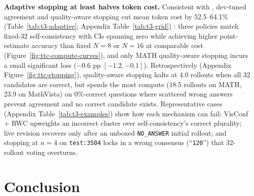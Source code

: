 \documentclass{article}
\begin{document}
\textbf{Adaptive stopping at least halves token cost.} Consistent with \citet{aggarwal2023adaptiveconsistency}, dev-tuned agreement and quality-aware stopping cut mean token cost by 52.5--64.1\% (Table~\ref{tab:t3-adaptive}; Appendix Table~\ref{tab:t3-grid}) \citep{usman2026visconf}: three policies match fixed-32 self-consistency with CIs spanning zero while achieving higher point-estimate accuracy than fixed $N=8$ or $N=16$ at comparable cost (Figure~\ref{fig:ttc-compute-curves}), and only MATH quality-aware stopping incurs a small significant loss ($-0.6$ pp $[-1.2, -0.1]$). Retrospectively (Appendix Figure~\ref{fig:ttc-stopping}), quality-aware stopping halts at 4.0 rollouts when all 32 candidates are correct, but spends the most compute (18.5 rollouts on MATH, 23.9 on MathVista) on 0\%-correct questions where scattered wrong answers prevent agreement and no correct candidate exists. Representative cases (Appendix Table~\ref{tab:t3-examples}) show how each mechanism can fail: VisConf + RWC upweights an incorrect cluster over self-consistency's correct plurality; live revision recovers only after an unboxed \texttt{NO\_ANSWER} initial rollout; and stopping at $n=4$ on \texttt{test:3504} locks in a wrong consensus (``\texttt{120}'') that 32-rollout voting overturns.

\section{Conclusion}
\label{sec:conclusion}
\end{document}
